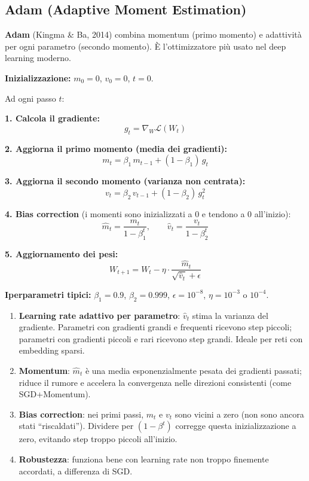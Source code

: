 \documentclass[
  11pt,
]{article}
\begin{document}
\subsection{Adam (Adaptive Moment Estimation)}

\textbf{Adam} (Kingma \& Ba, 2014) combina momentum (primo momento) e adattività per ogni parametro (secondo momento). È l'ottimizzatore più usato nel deep learning moderno.

\begin{formulabox}[title={\textbf{Adam --- Algoritmo completo}}]
\textbf{Inizializzazione:} $m_0 = 0$, $v_0 = 0$, $t = 0$.

Ad ogni passo $t$:

\textbf{1. Calcola il gradiente:}
\[
g_t = \nabla_W \mathcal{L}(W_t)
\]

\textbf{2. Aggiorna il primo momento (media dei gradienti):}
\[
m_t = \beta_1\, m_{t-1} + (1 - \beta_1)\, g_t
\]

\textbf{3. Aggiorna il secondo momento (varianza non centrata):}
\[
v_t = \beta_2\, v_{t-1} + (1 - \beta_2)\, g_t^2
\]

\textbf{4. Bias correction} (i momenti sono inizializzati a 0 e tendono a 0 all'inizio):
\[
\hat{m}_t = \frac{m_t}{1 - \beta_1^t}, \qquad \hat{v}_t = \frac{v_t}{1 - \beta_2^t}
\]

\textbf{5. Aggiornamento dei pesi:}
\[
W_{t+1} = W_t - \eta \cdot \frac{\hat{m}_t}{\sqrt{\hat{v}_t} + \epsilon}
\]

\textbf{Iperparametri tipici:} $\beta_1 = 0.9$, $\beta_2 = 0.999$, $\epsilon = 10^{-8}$, $\eta = 10^{-3}$ o $10^{-4}$.
\end{formulabox}

\begin{notabox}[title={\textbf{Perché Adam funziona bene?}}]
\begin{enumerate}
  \item \textbf{Learning rate adattivo per parametro}: $\hat{v}_t$ stima la varianza del gradiente. Parametri con gradienti grandi e frequenti ricevono step piccoli; parametri con gradienti piccoli e rari ricevono step grandi. Ideale per reti con embedding sparsi.
  \item \textbf{Momentum}: $\hat{m}_t$ è una media esponenzialmente pesata dei gradienti passati; riduce il rumore e accelera la convergenza nelle direzioni consistenti (come SGD+Momentum).
  \item \textbf{Bias correction}: nei primi passi, $m_t$ e $v_t$ sono vicini a zero (non sono ancora stati ``riscaldati''). Dividere per $(1-\beta^t)$ corregge questa inizializzazione a zero, evitando step troppo piccoli all'inizio.
  \item \textbf{Robustezza}: funziona bene con learning rate non troppo finemente accordati, a differenza di SGD.
\end{enumerate}
\end{notabox}
\end{document}
